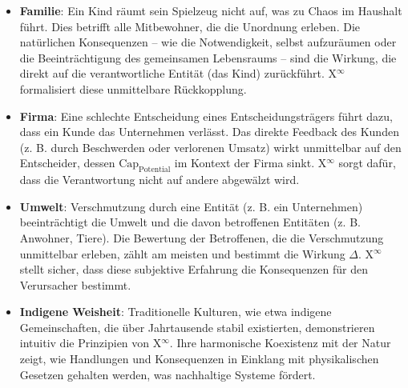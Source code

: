 \documentclass[12pt]{scrartcl}
\begin{document}
\begin{itemize}
    \item \textbf{Familie}: Ein Kind räumt sein Spielzeug nicht auf, was zu Chaos im Haushalt führt. Dies betrifft alle Mitbewohner, die die Unordnung erleben. Die natürlichen Konsequenzen – wie die Notwendigkeit, selbst aufzuräumen oder die Beeinträchtigung des gemeinsamen Lebensraums – sind die Wirkung, die direkt auf die verantwortliche Entität (das Kind) zurückführt. X$^\infty$ formalisiert diese unmittelbare Rückkopplung.
    \item \textbf{Firma}: Eine schlechte Entscheidung eines Entscheidungsträgers führt dazu, dass ein Kunde das Unternehmen verlässt. Das direkte Feedback des Kunden (z. B. durch Beschwerden oder verlorenen Umsatz) wirkt unmittelbar auf den Entscheider, dessen $\text{Cap}_{\text{Potential}}$ im Kontext der Firma sinkt. X$^\infty$ sorgt dafür, dass die Verantwortung nicht auf andere abgewälzt wird.
    \item \textbf{Umwelt}: Verschmutzung durch eine Entität (z. B. ein Unternehmen) beeinträchtigt die Umwelt und die davon betroffenen Entitäten (z. B. Anwohner, Tiere). Die Bewertung der Betroffenen, die die Verschmutzung unmittelbar erleben, zählt am meisten und bestimmt die Wirkung $\Delta$. X$^\infty$ stellt sicher, dass diese subjektive Erfahrung die Konsequenzen für den Verursacher bestimmt.
    \item \textbf{Indigene Weisheit}: Traditionelle Kulturen, wie etwa indigene Gemeinschaften, die über Jahrtausende stabil existierten, demonstrieren intuitiv die Prinzipien von X$^\infty$. Ihre harmonische Koexistenz mit der Natur zeigt, wie Handlungen und Konsequenzen in Einklang mit physikalischen Gesetzen gehalten werden, was nachhaltige Systeme fördert.
\end{itemize}
\end{document}
